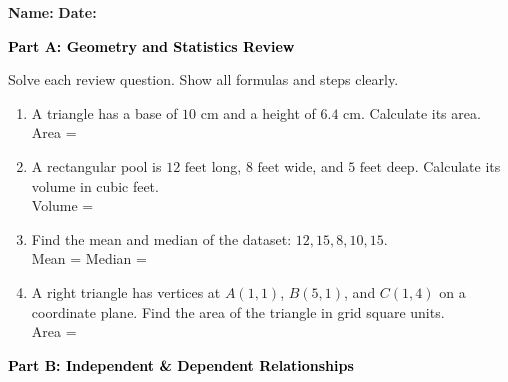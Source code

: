 \documentclass[12pt, letterpaper, fleqn]{article}
\newcommand{\blanklong}{\underline{\hspace{6.5cm}}}
\newcommand{\blankshorter}{\underline{\hspace{1.5cm}}}
\begin{document}
\textbf{Name:} \underline{\hspace{5cm}}
\hfill
\textbf{Date:} \underline{\hspace{3cm}}\\

\begin{tcolorbox}[colback=black!10]
    \large\textcolor{black}{\textbf{Part A: Geometry and Statistics Review}}
\end{tcolorbox}

\vspace{3mm}

\noindent
Solve each review question. Show all formulas and steps clearly.

\vspace{5mm}

\begin{enumerate}[itemsep=2.0cm, leftmargin=0.6cm]
\item A triangle has a base of $10\text{ cm}$ and a height of $6.4\text{ cm}$. Calculate its area. \\
Area = \blanklong

\item A rectangular pool is $12\text{ feet}$ long, $8\text{ feet}$ wide, and $5\text{ feet}$ deep. Calculate its volume in cubic feet. \\
Volume = \blanklong

\item Find the mean and median of the dataset: $12, 15, 8, 10, 15$. \\
Mean = \blankshorter \quad Median = \blankshorter

\item A right triangle has vertices at $A(1, 1)$, $B(5, 1)$, and $C(1, 4)$ on a coordinate plane. Find the area of the triangle in grid square units. \\
Area = \blanklong
\end{enumerate}

\newpage

\begin{tcolorbox}[colback=black!10]
    \large\textcolor{black}{\textbf{Part B: Independent \& Dependent Relationships}}
\end{tcolorbox}
\end{document}
